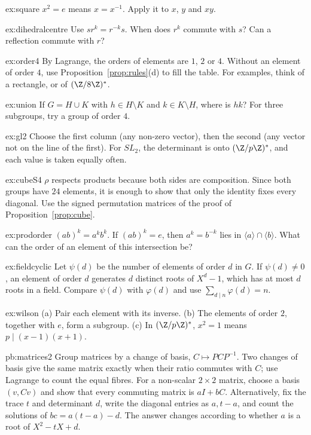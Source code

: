 \begin{hint}{ex:square}
$x^2=e$ means $x=x^{-1}$. Apply it to $x$, $y$ and $xy$.
\end{hint}
\begin{hint}{ex:dihedralcentre}
Use $sr^k=r^{-k}s$. When does $r^k$ commute with $s$? Can a reflection commute with $r$?
\end{hint}
\begin{hint}{ex:order4}
By Lagrange, the orders of elements are $1$, $2$ or $4$. Without an element of order $4$, use Proposition~\ref{prop:rules}(d) to fill the table. For examples, think of a rectangle, or of $(\Z/8\Z)^*$.
\end{hint}
\begin{hint}{ex:union}
If $G=H\cup K$ with $h\in H\setminus K$ and $k\in K\setminus H$, where is $hk$? For three subgroups, try a group of order $4$.
\end{hint}
\begin{hint}{ex:gl2}
Choose the first column (any non-zero vector), then the second (any vector not on the line of the first). For $SL_2$, the determinant is onto $(\Z/p\Z)^*$, and each value is taken equally often.
\end{hint}
\begin{hint}{ex:cubeS4}
$\rho$ respects products because both sides are composition. Since both groups have $24$ elements, it is enough to show that only the identity fixes every diagonal. Use the signed permutation matrices of the proof of Proposition~\ref{prop:cube}.
\end{hint}
\begin{hint}{ex:prodorder}
$(ab)^k=a^kb^k$. If $(ab)^k=e$, then $a^k=b^{-k}$ lies in $\langle a\rangle\cap\langle b\rangle$. What can the order of an element of this intersection be?
\end{hint}
\begin{hint}{ex:fieldcyclic}
Let $\psi(d)$ be the number of elements of order $d$ in $G$. If $\psi(d)\ne0$, an element of order $d$ generates $d$ distinct roots of $X^d-1$, which has at most $d$ roots in a field. Compare $\psi(d)$ with $\varphi(d)$ and use $\sum_{d\mid n}\varphi(d)=n$.
\end{hint}
\begin{hint}{ex:wilson}
(a) Pair each element with its inverse. (b) The elements of order $2$, together with $e$, form a subgroup. (c) In $(\Z/p\Z)^*$, $x^2=1$ means $p\mid(x-1)(x+1)$.
\end{hint}

\begin{hint}{pb:matrices2}
Group matrices by a change of basis, $C\mapsto PCP^{-1}$. Two changes of basis give the same matrix exactly when their ratio commutes with $C$; use Lagrange to count the equal fibres. For a non-scalar $2\times2$ matrix, choose a basis $(v,Cv)$ and show that every commuting matrix is $aI+bC$.
Alternatively, fix the trace $t$ and determinant $d$, write the diagonal
entries as $a,t-a$, and count the solutions of $bc=a(t-a)-d$.
The answer changes according to whether $a$ is a root of $X^2-tX+d$.
\end{hint}

